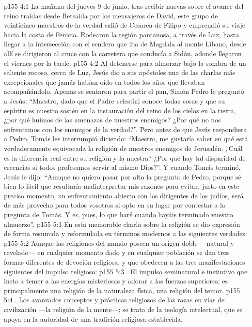 \vs p155 4:1 La mañana del jueves 9 de junio, tras recibir nuevas sobre el avance del reino traídas desde Betsaida por los mensajeros de David, este grupo de veinticinco maestros de la verdad salió de Cesarea de Filipo y emprendió su viaje hacia la costa de Fenicia. Rodearon la región pantanosa, a través de Luz, hasta llegar a la intersección con el sendero que iba de Magdala al monte Líbano, desde allí se dirigieron al cruce con la carretera que conducía a Sidón, adonde llegaron el viernes por la tarde.
\vs p155 4:2 Al detenerse para almorzar bajo la sombra de un saliente rocoso, cerca de Luz, Jesús dio a sus apóstoles una de las charlas más excepcionales que jamás habían oído en todos los años que llevaban acompañándolo. Apenas se sentaron para partir el pan, Simón Pedro le preguntó a Jesús: “Maestro, dado que el Padre celestial conoce todas cosas y que su espíritu es nuestro sostén en la instauración del reino de los cielos en la tierra, ¿por qué huimos de las amenazas de nuestros enemigos? ¿Por qué no nos enfrentamos con los enemigos de la verdad?”. Pero antes de que Jesús respondiera a Pedro, Tomás les interrumpió diciendo: “Maestro, me gustaría saber en qué está verdaderamente equivocada la religión de nuestros enemigos de Jerusalén. ¿Cuál es la diferencia real entre su religión y la nuestra? ¿Por qué hay tal disparidad de creencias si todos profesamos servir al mismo Dios?”. Y cuando Tomás terminó, Jesús le dijo: “Aunque no quiero pasar por alto la pregunta de Pedro, porque sé bien lo fácil que resultaría malinterpretar mis razones para evitar, justo en este preciso momento, un enfrentamiento abierto con los dirigentes de los judíos, será de más provecho para todos vosotros si opto en su lugar por contestar a la pregunta de Tomás. Y es, pues, lo que haré cuando hayáis terminado vuestro almuerzo”.
\vs p155 5:1 En esta memorable charla sobre la religión se dio expresión de forma resumida y reformulada en términos modernos a las siguientes verdades:
\vs p155 5:2 \pc Aunque las religiones del mundo poseen un origen doble ---natural y revelado--- en cualquier momento dado y en cualquier población se dan tres formas diferentes de devoción religiosa, y que obedecen a las tres manifestaciones siguientes del impulso religioso:
\vs p155 5:3 . El impulso seminatural e instintivo que insta a temer a las energías misteriosas y adorar a las fuerzas superiores; es principalmente una religión de la naturaleza física, una religión del temor.
\vs p155 5:4 . Los avanzados conceptos y prácticas religiosos de las razas en vías de civilización ---la religión de la mente---; se trata de la teología intelectual, que se apoya en la autoridad de una tradición religiosa establecida.
